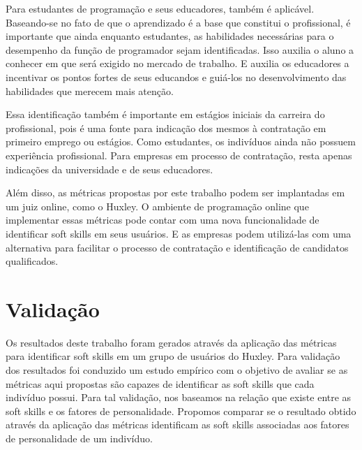 Para estudantes de programação e seus educadores, também é aplicável. Baseando-se no fato de que o aprendizado é a base que constitui o profissional, é importante que ainda enquanto estudantes, as habilidades necessárias para o desempenho da função de programador sejam identificadas. Isso auxilia o aluno a conhecer em que será exigido no mercado de trabalho. E auxilia os educadores a incentivar os pontos fortes de seus educandos e guiá-los no desenvolvimento das habilidades que merecem mais atenção.

Essa identificação também é importante em estágios iniciais da carreira do profissional, pois é uma fonte para indicação dos mesmos à contratação em primeiro emprego ou estágios. Como estudantes, os indivíduos ainda não possuem experiência profissional. Para empresas em processo de contratação, resta apenas indicações da universidade e de seus educadores.

Além disso, as métricas propostas por este trabalho podem ser implantadas em um juiz online, como o Huxley. O ambiente de programação online que implementar essas métricas pode contar com uma nova funcionalidade de identificar soft skills em seus usuários. E as empresas podem utilizá-las com uma alternativa para facilitar o processo de contratação e identificação de candidatos qualificados.



\section{Validação}

Os resultados deste trabalho foram gerados através da aplicação das métricas para identificar soft skills em um grupo de usuários do Huxley. Para validação dos resultados foi conduzido um estudo empírico com o objetivo de avaliar se as métricas aqui propostas são capazes de identificar as soft skills que cada indivíduo possui.
Para tal validação, nos baseamos na relação que existe entre as soft skills e os fatores de personalidade. Propomos comparar se o resultado obtido através da aplicação das métricas identificam as soft skills associadas aos fatores de personalidade de um indivíduo.

